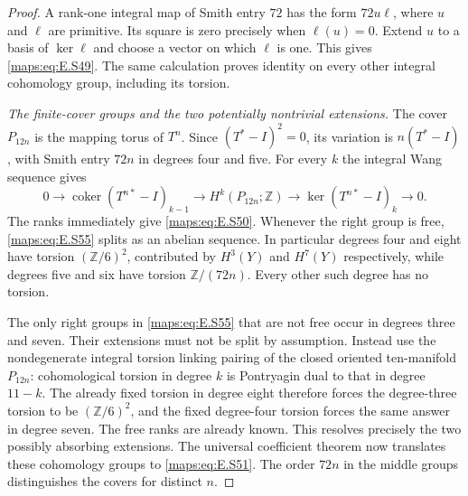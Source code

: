 \begin{proof}
A rank-one integral map of Smith entry $72$ has the
form $72u\ell$, where $u$ and $\ell$ are primitive.
Its square is zero precisely when $\ell(u)=0$.
Extend $u$ to a basis of $\ker\ell$ and choose a vector
on which $\ell$ is one. This gives \eqref{maps:eq:E.S49}. The same
calculation proves identity on every other integral
cohomology group, including its torsion.

\emph{The finite-cover groups and the two potentially nontrivial extensions.}
The cover $P_{12n}$ is the mapping torus of $T^n$.
Since $(T^*-I)^2=0$, its variation is $n(T^*-I)$,
with Smith entry $72n$ in degrees four and five.
For every $k$ the integral Wang sequence gives
\[
 0\longrightarrow\operatorname{coker}(T^{n*}-I)_{k-1}
 \longrightarrow H^k(P_{12n};\mathbb Z)
 \longrightarrow\ker(T^{n*}-I)_k\longrightarrow0.
 \tag{E.S55}\label{maps:eq:E.S55}
\]
The ranks immediately give \eqref{maps:eq:E.S50}. Whenever the right
group is free, \eqref{maps:eq:E.S55} splits as an abelian sequence.
In particular degrees four and eight have torsion
$(\mathbb Z/6)^2$, contributed by $H^3(Y)$ and $H^7(Y)$
respectively, while degrees five and six have torsion
$\mathbb Z/(72n)$. Every other such degree has no torsion.

The only right groups in \eqref{maps:eq:E.S55} that are not free
occur in degrees three and seven. Their extensions
must not be split by assumption. Instead use the
nondegenerate integral torsion linking pairing of the
closed oriented ten-manifold $P_{12n}$: cohomological
torsion in degree $k$ is Pontryagin dual to that in
degree $11-k$. The already fixed torsion in degree
eight therefore forces the degree-three torsion to
be $(\mathbb Z/6)^2$, and the fixed degree-four torsion
forces the same answer in degree seven. The free
ranks are already known. This resolves precisely
the two possibly absorbing extensions. The universal
coefficient theorem now translates these cohomology
groups to \eqref{maps:eq:E.S51}. The order $72n$ in the middle
groups distinguishes the covers for distinct $n$.
\end{proof}


